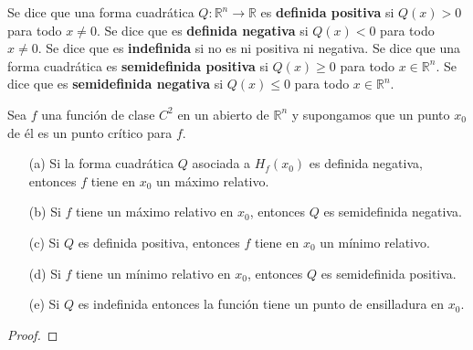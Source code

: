 \begin{definición}
    Se dice que una forma cuadrática $Q: \mathbb{R}^n \to \mathbb{R}$ es \textbf{definida positiva} si $Q(x) > 0$ para todo $x \neq 0$. Se dice que es \textbf{definida negativa} si $Q(x) < 0$ para todo $x \neq 0$. Se dice que es \textbf{indefinida} si no es ni positiva ni negativa.
    Se dice que una forma cuadrática es \textbf{semidefinida positiva} si $Q(x) \geq 0$ para todo $x \in \mathbb{R}^n$. Se dice que es \textbf{semidefinida negativa} si $Q(x) \leq 0$ para todo $x \in \mathbb{R}^n$.
\end{definición}
\begin{teorema}
    Sea $f$ una función de clase $C^2$ en un abierto de $\mathbb{R}^n$ y supongamos que un punto $x_0$ de él es un punto crítico para $f$.
    \begin{itemize}
        \item[(a)] Si la forma cuadrática $Q$ asociada a $H_f(x_0)$ es definida negativa, entonces $f$ tiene en $x_0$ un máximo relativo.
        \item[(b)] Si $f$ tiene un máximo relativo en $x_0$, entonces $Q$ es semidefinida negativa.
        \item[(c)] Si $Q$ es definida positiva, entonces $f$ tiene en $x_0$ un mínimo relativo.
        \item[(d)] Si $f$ tiene un mínimo relativo en $x_0$, entonces $Q$ es semidefinida positiva.
        \item[(e)] Si $Q$ es indefinida entonces la función tiene un punto de ensilladura en $x_0$.
    \end{itemize}
\end{teorema}
\begin{proof}
    
\end{proof}


